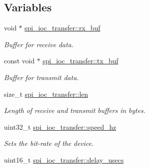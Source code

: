 \subsection*{Variables}
\begin{DoxyCompactItemize}
\item 
\mbox{\label{group__SPILinux_ga598f15883066b4a097ea5d62e04cfc78}} 
void $\ast$ \mbox{\hyperlink{group__SPILinux_ga598f15883066b4a097ea5d62e04cfc78}{spi\+\_\+ioc\+\_\+transfer\+::rx\+\_\+buf}}
\begin{DoxyCompactList}\small\item\em Buffer for receive data. \end{DoxyCompactList}\item 
\mbox{\label{group__SPILinux_gafc9ba3d61346406344752100c42244c5}} 
const void $\ast$ \mbox{\hyperlink{group__SPILinux_gafc9ba3d61346406344752100c42244c5}{spi\+\_\+ioc\+\_\+transfer\+::tx\+\_\+buf}}
\begin{DoxyCompactList}\small\item\em Buffer for transmit data. \end{DoxyCompactList}\item 
\mbox{\label{group__SPILinux_gaeffdeb47a920abe43882e32be721f7af}} 
size\+\_\+t \mbox{\hyperlink{group__SPILinux_gaeffdeb47a920abe43882e32be721f7af}{spi\+\_\+ioc\+\_\+transfer\+::len}}
\begin{DoxyCompactList}\small\item\em Length of receive and transmit buffers in bytes. \end{DoxyCompactList}\item 
\mbox{\label{group__SPILinux_ga54a0d2d693971f1443bdc4b76915df52}} 
uint32\+\_\+t \mbox{\hyperlink{group__SPILinux_ga54a0d2d693971f1443bdc4b76915df52}{spi\+\_\+ioc\+\_\+transfer\+::speed\+\_\+hz}}
\begin{DoxyCompactList}\small\item\em Sets the bit-\/rate of the device. \end{DoxyCompactList}\item 
\mbox{\label{group__SPILinux_ga8cdb8c28a3607def74af35fefbe72a74}} 
uint16\+\_\+t \mbox{\hyperlink{group__SPILinux_ga8cdb8c28a3607def74af35fefbe72a74}{spi\+\_\+ioc\+\_\+transfer\+::delay\+\_\+usecs}}

\end{DoxyCompactItemize}
